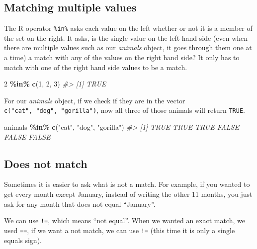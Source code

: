\documentclass[
  12pt,
]{book}
\newenvironment{Shaded}{\begin{snugshade}}{\end{snugshade}}
\newcommand{\CommentTok}[1]{\textcolor[rgb]{0.37,0.37,0.37}{\textit{#1}}}
\newcommand{\DecValTok}[1]{\textcolor[rgb]{0.06,0.06,0.06}{#1}}
\newcommand{\KeywordTok}[1]{\textcolor[rgb]{0.27,0.27,0.27}{\textbf{#1}}}
\newcommand{\NormalTok}[1]{#1}
\newcommand{\OperatorTok}[1]{\textcolor[rgb]{0.43,0.43,0.43}{\textbf{#1}}}
\newcommand{\StringTok}[1]{\textcolor[rgb]{0.5,0.5,0.5}{#1}}
\begin{document}
\hypertarget{matching-multiple-values}{%
\subsection{Matching multiple values}\label{matching-multiple-values}}

The R operator \texttt{\%in\%} asks each value on the left whether or not it is a member of the set on the right. It asks, is the single value on the left hand side (even when there are multiple values such as our \emph{animals} object, it goes through them one at a time) a match with any of the values on the right hand side? It only has to match with one of the right hand side values to be a match.

\begin{Shaded}
\begin{Highlighting}[]
\DecValTok{2} \OperatorTok{\%in\%}\StringTok{ }\KeywordTok{c}\NormalTok{(}\DecValTok{1}\NormalTok{, }\DecValTok{2}\NormalTok{, }\DecValTok{3}\NormalTok{) }
\CommentTok{\#> [1] TRUE}
\end{Highlighting}
\end{Shaded}

For our \emph{animals} object, if we check if they are in the vector \texttt{c("cat",\ "dog",\ "gorilla")}, now all three of those animals will return \texttt{TRUE}.

\begin{Shaded}
\begin{Highlighting}[]
\NormalTok{animals }\OperatorTok{\%in\%}\StringTok{ }\KeywordTok{c}\NormalTok{(}\StringTok{"cat"}\NormalTok{, }\StringTok{"dog"}\NormalTok{, }\StringTok{"gorilla"}\NormalTok{)}
\CommentTok{\#> [1]  TRUE  TRUE  TRUE FALSE FALSE FALSE}
\end{Highlighting}
\end{Shaded}

\hypertarget{does-not-match}{%
\subsection{Does not match}\label{does-not-match}}

Sometimes it is easier to ask what is not a match. For example, if you wanted to get every month except January, instead of writing the other 11 months, you just ask for any month that does not equal ``January''.

We can use \texttt{!=}, which means ``not equal''. When we wanted an exact match, we used \texttt{==}, if we want a not match, we can use \texttt{!=} (this time it is only a single equals sign).
\end{document}
